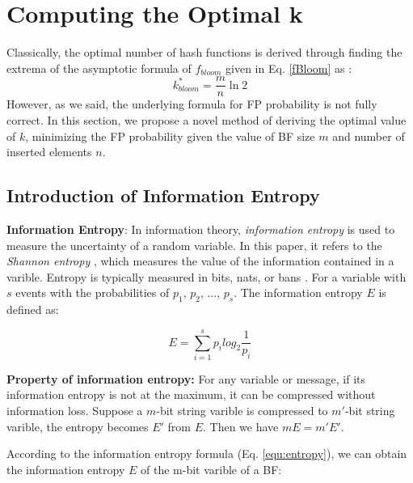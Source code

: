 \presec
\section{Computing the Optimal k} \postsec
\label{sec:optimalk}

Classically, the optimal number of hash functions is derived through finding the extrema of the asymptotic formula of $f_{bloom}$ given in Eq. \ref{fBloom} as :
\begin{equation}
\label{eq:kopt}
k^*_{bloom}=\frac{m}{n}\ln 2
\end{equation}
However, as we said, the underlying formula for FP probability is not fully correct. In this section, we propose a novel method of deriving the optimal value of $k$, minimizing the FP probability given the value of BF size $m$ and number of inserted elements $n$.


\subsection{Introduction of Information Entropy}
\textbf{Information Entropy}: In information theory, \textit{information entropy} is used to measure the uncertainty of a random variable. In this paper, it refers to the \textit{Shannon entropy} \cite{shannon}, which measures the value of the information contained in a varible.  Entropy is typically measured in bits, nats, or bans \cite{entropy}. For a variable with $s$ events with the probabilities of $p_1$, $p_2$, ..., $p_s$. The information entropy $E$ is defined as:

\begin{equation}
 E=\sum_{i=1}^{s}p_i  log_2 \dfrac{1}{p_i}
\label{equ:entropy}
\end{equation}

\textbf{Property of information entropy:}
For any variable or message, if its information entropy is not at the maximum, it can be compressed without information loss. Suppose a $m$-bit string varible is compressed to $m'$-bit string varible, the entropy becomes $E'$ from $E$. Then we have $mE=m'E'$.
%
%


According to the information entropy formula (Eq. \ref{equ:entropy}), we can obtain the information entropy $E$ of the m-bit varible of a BF:

